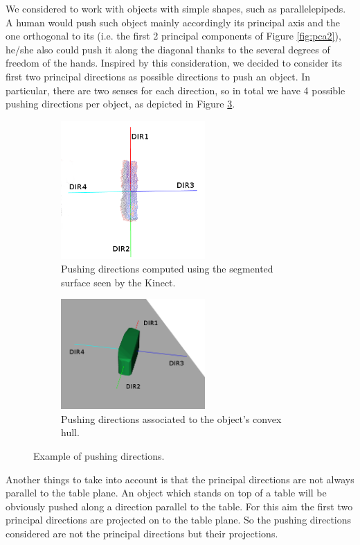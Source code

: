 We considered to work with objects with simple shapes, such as parallelepipeds. 
A human would push such object mainly accordingly its principal axis and the one orthogonal to its (i.e. the first 2 principal components of Figure \ref{fig:pca2}), he/she also could push it along the diagonal thanks to the several degrees of freedom of the hands. 
Inspired by this consideration, we decided to consider its first two principal directions as possible directions to push an object. In particular, there are two senses for each direction, so in total we have 4 possible pushing directions per object, as depicted in Figure \ref{fig:directions}.

\begin{figure}
\centering
\begin{subfigure}[t]{6cm}
\includegraphics[width=5.5cm]{Img/pushing/directions.png}
\caption{Pushing directions computed using the segmented surface seen by the Kinect.}\label{fig:directions1}
\end{subfigure}
\quad
\begin{subfigure}[t]{6cm}
\includegraphics[width=5.5cm]{Img/pushing/directions2.png}
\caption{Pushing directions associated to the object's convex hull.}
\label{fig:directions2}
\end{subfigure}
\caption{Example of pushing directions.}\label{fig:directions}
\end{figure}


Another things to take into account is that the principal directions are not always parallel to the table plane. An object which stands on top of a table will be obviously pushed along a direction parallel to the table. For this aim the first two principal directions are projected on to the table plane. So the pushing directions considered are not the principal directions but their projections. 

